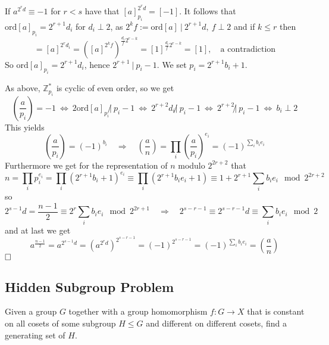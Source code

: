 \documentclass{scrartcl}
\newcommand{\Z}{\mathbb{Z}}
\begin{document}
If $a^{2^rd} \equiv -1$ for $r < s$ have that $[a]_{p_i}^{2^rd} = [-1]$. It follows that $\mathrm{ord} [a]_{p_i} = 2^{r + 1}d_i$ for $d_i \perp 2$, as $2^kf := \mathrm{ord}[a] \ | \ 2^{r + 1}d, \ f \perp 2$ and if $k \leq r$ then
\begin{equation*}
    [-1] = [a]^{2^rd_i} = \left([a]^{2^k f}\right)^{\frac {d_i} f 2^{r - k}} = [1]^{\frac {d_i} f 2^{r - k}} = [1], \quad \text{a contradiction}
\end{equation*}
So $\mathrm{ord} [a]_{p_i} = 2^{r + 1}d_i$, hence $2^{r + 1} \ | \ p_i - 1$. We set $p_i = 2^{r + 1} b_i + 1$.

As above, $\Z_{p_i}^*$ is cyclic of even order, so we get
\begin{equation*}
    \left(\frac a {p_i}\right) = -1 \ \Leftrightarrow \ 2 \mathrm{ord}[a]_{p_i} \not| \ p_i - 1 \ \Leftrightarrow \ 2^{r + 2}d_i \not| \ p_i - 1  \ \Leftrightarrow \ 2^{r + 2} \not| \ p_i - 1 \ \Leftrightarrow \ b_i \perp 2
\end{equation*}
This yields
\begin{equation*}
    \left(\frac a {p_i}\right) = (-1)^{b_i} \quad \Rightarrow \quad \left(\frac a n\right) = \prod_i \left(\frac a {p_i}\right)^{e_i} = (-1)^{\sum_i b_i e_i}
\end{equation*}
Furthermore we get for the representation of $n$ modulo $2^{2r + 2}$ that
\begin{equation*}
    n = \prod_i p_i^{e_i} = \prod_i (2^{r + 1} b_i + 1)^{e_i} \equiv \prod_i (2^{r + 1} b_i e_i + 1) \equiv 1 + 2^{r + 1} \sum_i b_i e_i \mod 2^{2r + 2}
\end{equation*}
so
\begin{equation*}
    2^{s - 1}d = \frac {n - 1} 2 \equiv 2^r \sum_i b_i e_i \mod 2^{2r + 1} \quad \Rightarrow \quad 2^{s - r - 1} \equiv 2^{s - r - 1}d \equiv \sum_i b_i e_i \mod 2
\end{equation*}
and at last we get
\begin{equation*}
    a^{\frac {n - 1} 2} = a^{2^{s - 1}d} = \left( a^{2^rd} \right)^{2^{s - r - 1}} = (-1)^{2^{s - r - 1}} = (-1)^{\sum_i b_i e_i} = \left(\frac a n\right)
\end{equation*}
$\hfill\square$

\subsection{Hidden Subgroup Problem}
Given a group $G$ together with a group homomorphism $f: G \to X$ that is constant on all cosets of some subgroup $H \leq G$ and different on different cosets, find a generating set of $H$.
\end{document}
